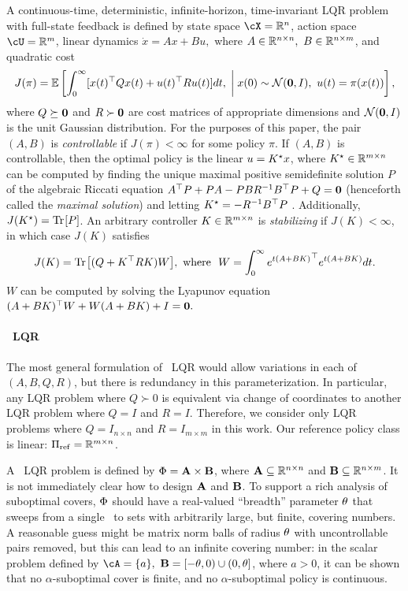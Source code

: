 A continuous-time, deterministic, infinite-horizon, time-invariant LQR problem with full-state feedback is defined by 
state space $\cX = \R^n$,
action space $\cU = \R^m$,
linear dynamics
\(
	\dot x = Ax + Bu,
\)
where $A \in \mathbb{R}^{n \times n},\ B \in \mathbb{R}^{n \times m}$, and quadratic cost 
\[
	J(\pi) = \operatorname*{\mathbb{E}} \left[
		\int_0^\infty 
			[x(t)^\top Q x(t) + u(t)^\top R u(t)] dt,
		\;\middle\vert\;
		x(0) \sim \operatorname{\mathcal{N}}(\mathbf{0}, I),\ u(t) = \pi(x(t))
	\right],
\]
where $Q \succeq \mathbf{0}$ and $R \succ \mathbf{0}$ are cost matrices of appropriate dimensions
and $\operatorname{\mathcal{N}}(\mathbf{0}, I)$ is the unit Gaussian distribution.
For the purposes of this paper, the pair $(A, B)$ is \emph{controllable}
if $J(\pi) < \infty$ for some policy $\pi$.
If $(A, B)$ is controllable,
then the optimal policy %
is the linear
$u = K^\star_{} x$,
where $K^\star_{} \in \mathbb{R}^{m \times n}$
can be computed
by finding the unique maximal positive semidefinite solution $P$
of the algebraic Riccati equation
\(
	A^\top P + P A - P B R^{-1} B^\top P + Q = \mathbf{0}
\)
(henceforth called the \emph{maximal solution})
and letting $K^\star_{} = -R^{-1} B^\top P$
\citep{kalman-contributions}.
Additionally, $J(K^\star_{}) = \mathrm{Tr} \hspace{-1pt} \left[ P \right]$.
An arbitrary controller $K \in \mathbb{R}^{m \times n}$ is \emph{stabilizing} if
$J(K) < \infty$,
in which case $J(K)$ satisfies
\begin{equation}
\label{eq:cost-suboptimal}
	J(K) = \trace{(Q + K^\top R K) W}\!, \
\text{where} \ \ 
	W = \int_0^\infty {e^{t(A + BK)}}^\top {e^{t(A + BK)}} dt.
\end{equation}
$W$ can be computed by solving the Lyapunov equation
\(
	(A + BK)^\top W + W (A + BK)  + I = \mathbf{0}.
\)





\paragraph{\Multidyn\ LQR}
\label{sec:multilqr}
The most general formulation of \multienv\ LQR
would allow variations in each of $(A, B, Q, R)$,
but there is redundancy in this parameterization.
In particular, any LQR problem
where $Q \succ 0$
is equivalent via change of coordinates
to another LQR problem where $Q = I$ and $R = I$.
Therefore,
we consider only \emph{\multidyn} LQR problems where $Q = I_{n \times n}$ and $R = I_{m \times m}$
in this work.
Our reference policy class is linear: $\Pi_{\mathrm{ref}} = \mathbb{R}^{m \times n}$.

A \multidyn\ LQR problem is defined by
$\Phi = \mathbf{A} \times \mathbf{B}$,
where $\mathbf{A} \subseteq \mathbb{R}^{n \times n}$ and ${\mathbf{B} \subseteq \mathbb{R}^{n \times m}}$.
It is not immediately clear how to design $\mathbf{A}$ and $\mathbf{B}$.
To support a rich analysis of suboptimal covers,
$\Phi$ should have a real-valued ``breadth'' parameter $\theta$
that sweeps from a single \envword\ to sets with arbitrarily large, but finite, covering numbers.
A reasonable guess might be matrix norm balls of radius $\theta$ with uncontrollable pairs removed,
but this can lead to an infinite covering number:
in the scalar problem defined by $\cA = \{a\},\ \Bset = [-\breadth, 0) \cup (0, \breadth]$, where $a > 0$,
it can be shown that
no $\alpha$-suboptimal cover is finite,
and no $\alpha$-suboptimal policy is continuous.


